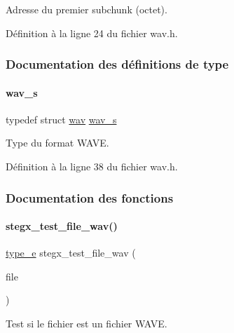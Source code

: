 Adresse du premier subchunk (octet). 

Définition à la ligne 24 du fichier wav.\+h.



\subsubsection{Documentation des définitions de type}
\mbox{\label{a00104_ae7804dffa1f86f00af57f8d7bfb9f1e1}} 
\paragraph{\texorpdfstring{wav\+\_\+s}{wav\_s}}
{\footnotesize\ttfamily typedef struct \hyperlink{a00178}{wav} \hyperlink{a00104_ae7804dffa1f86f00af57f8d7bfb9f1e1}{wav\+\_\+s}}

Type du format W\+A\+VE. 

Définition à la ligne 38 du fichier wav.\+h.



\subsubsection{Documentation des fonctions}
\mbox{\label{a00104_ade2af55cc4dbaf47d31e91a4681415f1}} 
\paragraph{\texorpdfstring{stegx\+\_\+test\+\_\+file\+\_\+wav()}{stegx\_test\_file\_wav()}}
{\footnotesize\ttfamily \hyperlink{a00047_af1ca434cca36ba9fb2a45f6cef3a16d6}{type\+\_\+e} stegx\+\_\+test\+\_\+file\+\_\+wav (\begin{DoxyParamCaption}\item[{F\+I\+LE $\ast$}]{file }\end{DoxyParamCaption})}



Test si le fichier est un fichier W\+A\+VE. 


